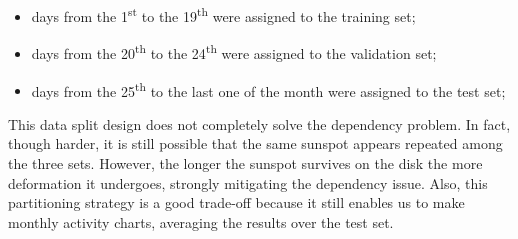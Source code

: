 \begin{itemize}
  \item days from the 1\textsuperscript{st} to the 19\textsuperscript{th} were assigned to the training set;
  \item days from the 20\textsuperscript{th} to the 24\textsuperscript{th} were assigned to the validation set;
  \item days from the 25\textsuperscript{th} to the last one of the month were assigned to the test set;
\end{itemize}
\bigbreak
\noindent This data split design does not completely solve the dependency problem. In fact, though harder, it is still possible that the same sunspot appears repeated among the three sets. However, the longer the sunspot survives on the disk the more deformation it undergoes, strongly mitigating the dependency issue. Also, this partitioning strategy is a good trade-off because it still enables us to make monthly activity charts, averaging the results over the test set.
\clearpage
